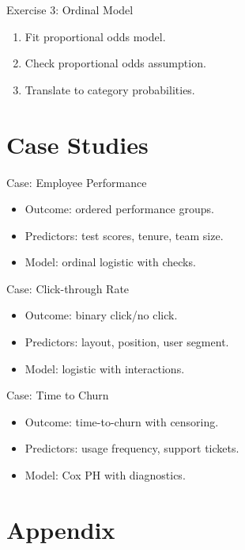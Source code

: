 \documentclass[aspectratio=169]{beamer}
\begin{document}
\begin{frame}{Exercise 3: Ordinal Model}
\begin{enumerate}
  \item Fit proportional odds model.
  \item Check proportional odds assumption.
  \item Translate to category probabilities.
\end{enumerate}
\end{frame}

\section{Case Studies}

\begin{frame}{Case: Employee Performance}
\begin{itemize}
  \item Outcome: ordered performance groups.
  \item Predictors: test scores, tenure, team size.
  \item Model: ordinal logistic with checks.
\end{itemize}
\end{frame}

\begin{frame}{Case: Click-through Rate}
\begin{itemize}
  \item Outcome: binary click/no click.
  \item Predictors: layout, position, user segment.
  \item Model: logistic with interactions.
\end{itemize}
\end{frame}

\begin{frame}{Case: Time to Churn}
\begin{itemize}
  \item Outcome: time-to-churn with censoring.
  \item Predictors: usage frequency, support tickets.
  \item Model: Cox PH with diagnostics.
\end{itemize}
\end{frame}

\section{Appendix}
\end{document}
